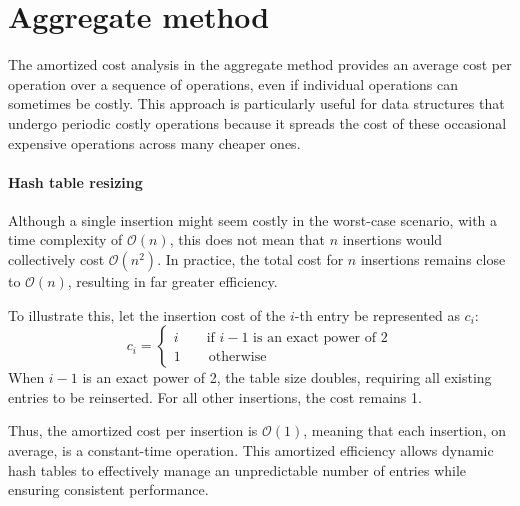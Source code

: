 \section{Aggregate method}

The amortized cost analysis in the aggregate method provides an average cost per operation over a sequence of operations, even if individual operations can sometimes be costly. 
This approach is particularly useful for data structures that undergo periodic costly operations because it spreads the cost of these occasional expensive operations across many cheaper ones.

\paragraph*{Hash table resizing}
Although a single insertion might seem costly in the worst-case scenario, with a time complexity of $\mathcal{O}(n)$, this does not mean that $n$ insertions would collectively cost $\mathcal{O}(n^2)$. 
In practice, the total cost for $n$ insertions remains close to $\mathcal{O}(n)$, resulting in far greater efficiency.

To illustrate this, let the insertion cost of the $i$-th entry be represented as $c_i$:
\[c_i=\begin{cases}
    i \qquad\text{if }i - 1 \text{ is an exact power of }2 \\
    1 \qquad\text{otherwise}
\end{cases}\]
When $i - 1$ is an exact power of 2, the table size doubles, requiring all existing entries to be reinserted. 
For all other insertions, the cost remains 1.

Thus, the amortized cost per insertion is $\mathcal{O}(1)$, meaning that each insertion, on average, is a constant-time operation. 
This amortized efficiency allows dynamic hash tables to effectively manage an unpredictable number of entries while ensuring consistent performance.